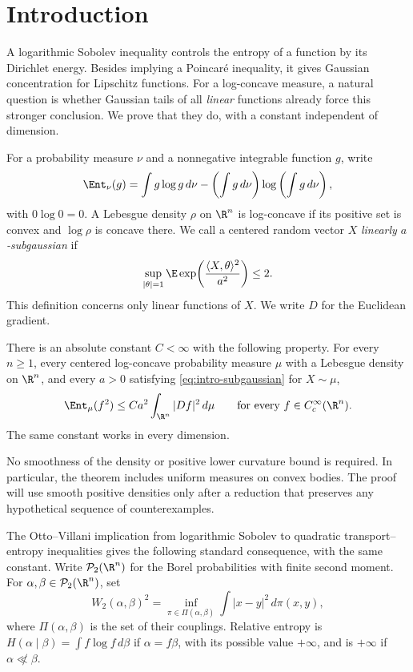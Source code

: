 \section{Introduction}\label{sec:introduction}

A logarithmic Sobolev inequality controls the entropy of a function by
its Dirichlet energy.  Besides implying a Poincar\'e inequality, it gives
Gaussian concentration for Lipschitz functions.  For a log-concave
measure, a natural question is whether Gaussian tails of all
\emph{linear} functions already force this stronger conclusion.
We prove that they do, with a constant independent of dimension.

For a probability measure \(\nu\) and a nonnegative integrable function \(g\),
write
\[
 \Ent_\nu(g)=\int g\log g\,d\nu
       -\left(\int g\,d\nu\right)\log\left(\int g\,d\nu\right),
\]
with \(0\log0=0\).  A Lebesgue density \(\rho\) on \(\R^n\) is log-concave
if its positive set is convex and \(\log\rho\) is concave there.
We call a centered random vector \(X\) \emph{linearly \(a\)-subgaussian} if
\begin{equation}\label{eq:intro-subgaussian}
 \sup_{|\theta|=1}\E\exp\!\left(\frac{\langle X,\theta\rangle^2}{a^2}\right)
 \le2.
\end{equation}
This definition concerns only linear functions of \(X\).  We write \(D\)
for the Euclidean gradient.

\begin{theorem}\label{thm:main}
There is an absolute constant \(C<\infty\) with the following property.
For every \(n\ge1\), every centered log-concave probability measure
\(\mu\) with a Lebesgue density on \(\R^n\), and every \(a>0\)
satisfying \eqref{eq:intro-subgaussian} for \(X\sim\mu\),
\[
 \Ent_\mu(f^2)\le C a^2\int_{\R^n}|Df|^2\,d\mu
 \qquad\text{for every }f\in C_c^\infty(\R^n).
\]
The same constant works in every dimension.
\end{theorem}

No smoothness of the density or positive lower curvature bound is required.
In particular, the theorem includes uniform measures on convex bodies.
The proof will use smooth positive densities only after a reduction that
preserves any hypothetical sequence of counterexamples.

The Otto--Villani implication from logarithmic Sobolev to quadratic
transport--entropy inequalities \cite[Theorem~1]{OttoVillani2000}
gives the following standard consequence, with the same constant.
Write $\mathcal P_2(\R^n)$ for the Borel probabilities with finite
second moment. For $\alpha,\beta\in\mathcal P_2(\R^n)$, set
\[
 W_2(\alpha,\beta)^2
 =\inf_{\pi\in\Pi(\alpha,\beta)}\int|x-y|^2\,d\pi(x,y),
\]
where $\Pi(\alpha,\beta)$ is the set of their couplings. Relative
entropy is $H(\alpha\mid\beta)=\int f\log f\,d\beta$ if
$\alpha=f\beta$, with its possible value $+\infty$, and is
$+\infty$ if $\alpha\not\ll\beta$.

